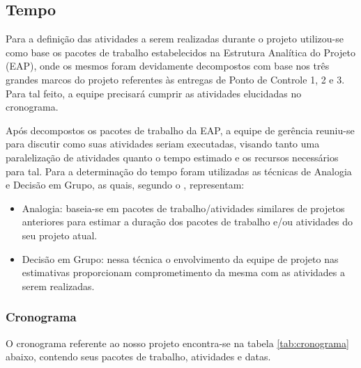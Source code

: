 \subsection{Tempo}


Para a definição das atividades a serem realizadas durante o projeto utilizou-se como base os pacotes de trabalho estabelecidos na Estrutura Analítica do Projeto (EAP),
onde os mesmos foram devidamente decompostos com base nos três grandes marcos do projeto referentes às entregas de Ponto de Controle 1, 2 e 3. Para tal feito, a equipe precisará cumprir as atividades elucidadas no cronograma.

Após decompostos os pacotes de trabalho da EAP, a equipe de gerência reuniu-se para discutir como suas atividades seriam executadas, visando tanto uma paralelização
de atividades quanto o tempo estimado e os recursos necessários para tal.
Para a determinação do tempo foram utilizadas as técnicas de Analogia e Decisão em Grupo, as quais, segundo o \cite{PMBK}, representam:

\begin{itemize}

\item Analogia: baseia-se em pacotes de trabalho/atividades similares de projetos anteriores para estimar a duração dos pacotes de trabalho e/ou atividades do seu projeto
atual.

\item Decisão em Grupo: nessa técnica o envolvimento da equipe de projeto nas estimativas proporcionam comprometimento da mesma com as atividades a serem realizadas.

\end{itemize}

\subsubsection{Cronograma}
O cronograma referente ao nosso projeto encontra-se na tabela \ref{tab:cronograma} abaixo, contendo seus pacotes de trabalho, atividades e datas. 

